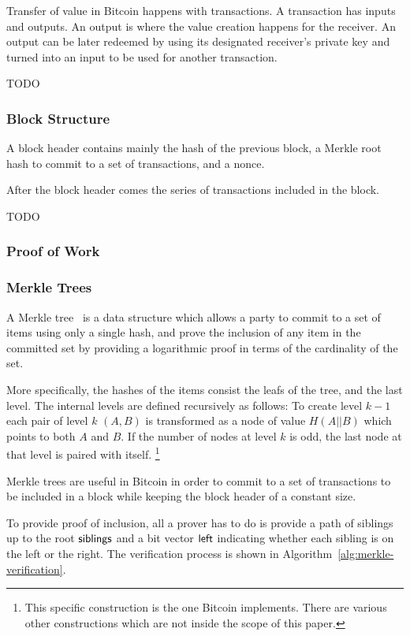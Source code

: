\documentclass[11pt]{llncs}
\begin{document}
Transfer of value in Bitcoin happens with transactions. A transaction has
inputs and outputs. An output is where the value creation happens for the
receiver. An output can be later redeemed by using its designated receiver's
private key and turned into an input to be used for another transaction.

TODO

\subsubsection{Block Structure}
A block header contains mainly the hash of the previous block, a Merkle root
hash to commit to a set of transactions, and a nonce.

After the block header comes the series of transactions included in the block.

TODO

\subsubsection{Proof of Work}
\subsubsection{Merkle Trees}
A Merkle tree~\cite{merkle} is a data structure which allows a party to
commit to a set of items using only a single hash, and prove the inclusion of
any item in the committed set by providing a logarithmic proof in terms of the
cardinality of the set.

More specifically, the hashes of the items consist the leafs of the tree, and
the last level. The internal levels are defined recursively as follows: To
create level $k-1$ each pair of level $k$ $(A, B)$ is transformed as a node
of value $H(A || B)$ which points to both $A$ and $B$. If the number of nodes
at level $k$ is odd, the last node at that level is paired with itself.
\footnote{This specific construction is the one Bitcoin implements. There are
various other constructions which are not inside the scope of this paper.}

Merkle trees are useful in Bitcoin in order to commit to a set of
transactions to be included in a block while keeping the block header of a
constant size.

To provide proof of inclusion, all a prover has to do is provide a path of
siblings up to the root $\sf{siblings}$ and a bit vector $\sf{left}$ indicating
whether each sibling is on the left or the right. The verification process is
shown in Algorithm~\ref{alg:merkle-verification}.
\end{document}
